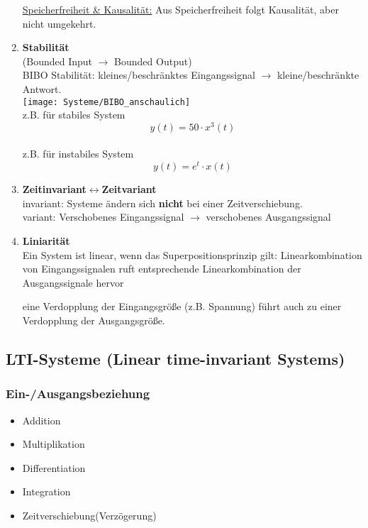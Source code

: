 \begin{enumerate}
      \underline{Speicherfreiheit \& Kausalit\"at:} Aus Speicherfreiheit
      folgt Kausalität, aber nicht umgekehrt.
  \item{\textbf{Stabilit\"at}}\\
  (Bounded Input $\rightarrow$ Bounded Output)\\BIBO Stabilit\"at:
  kleines/beschr\"anktes Eingangssignal $\rightarrow$ kleine/beschr\"ankte
  Antwort.\\
  \texttt{[image: Systeme/BIBO\_anschaulich]}\\
      z.B. f\"ur stabiles System
  \[
      y(t) = 50\cdot x^3(t)
  \]\\
      z.B. f\"ur instabiles System
  \[
      y(t) = e^{t}\cdot x(t)
  \]
  \item{\textbf{Zeitinvariant$\leftrightarrow$Zeitvariant}}\\
  \bulletpt invariant: Systeme \"andern sich \textbf{nicht} bei einer
  Zeitverschiebung.\\
  \bulletpt variant: Verschobenes Eingangssignal $\rightarrow$
  verschobenes Ausgangssignal
  \item{\textbf{Liniarit\"at}}\\
      Ein System ist linear, wenn das Superpositionsprinzip gilt:
      Linearkombination von Eingangssignalen ruft entsprechende
      Linearkombination der Ausgangssignale hervor
      \begin{mdframed}[style=exercise,frametitle=Bedeutung Liniarit\"at]
          eine Verdopplung der Eingangsgröße (z.B. Spannung) führt auch zu
          einer Verdopplung der Ausgangsgröße.
      \end{mdframed}
\end{enumerate}
\subsection{LTI-Systeme (Linear time-invariant Systems)}
\subsubsection{Ein-/Ausgangsbeziehung}
\begin{itemize}
  \item Addition
  \item Multiplikation
  \item Differentiation
  \item Integration
  \item Zeitverschiebung(Verz\"ogerung)
\end{itemize}
